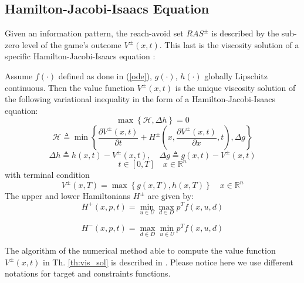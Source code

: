 \subsection{Hamilton-Jacobi-Isaacs Equation}
Given an information pattern, the reach-avoid set $RAS^\pm$ is described by the sub-zero level of the game's outcome $V^\pm(x,t)$. This last is the viscosity solution of a specific Hamilton-Jacobi-Isaacs equation \cite{new_paper}:
\begin{theorem}
    Assume $f(\cdot)$ defined as done in (\ref{ode}), $g(\cdot)$, $h(\cdot)$ globally Lipschitz continuous. Then the value function $V^\pm(x,t)$ is the unique viscosity solution of the following variational inequality in the form of a Hamilton-Jacobi-Isaacs equation:
    \[
        \max
        \left\{
            \mathcal{H}, \Delta h
        \right\} = 0
    \]
    \[
        \mathcal{H} \triangleq \min
        \left\{
            \frac{\partial V^\pm(x,t)}{\partial t} + 
            H^\pm\left(x, \frac{\partial V^\pm(x,t)}{\partial x}, t\right), \Delta g
        \right\} 
    \]
    \[
        \Delta h \triangleq h(x,t) - V^\pm(x,t), \quad \Delta g \triangleq g(x,t) - V^\pm(x,t)
    \]
    \[
        t \in [0, T] \quad x \in \mathbb{R}^n
    \]
    with terminal condition
    \[
        V^\pm(x,T) = \max \left\{ g(x,T), h(x,T) \right\} \quad x \in \mathbb{R}^n
    \]
    The upper and lower Hamiltonians $H^\pm$ are given by:
    \begin{equation}
        H^+(x,p,t) = \min_{u \in U}\max_{d \in D} p^T f(x, u, d)
        \label{h_p}
    \end{equation}

    \begin{equation}
        H^-(x,p,t) = \max_{d \in D}\min_{u \in U} p^T f(x, u, d)
        \label{h_m}
    \end{equation}
        
    \label{th:vis_sol}
\end{theorem}

The algorithm of the numerical method able to compute the value function $V^\pm(x,t)$ in Th. \ref{th:vis_sol} is described in \cite{new_paper}. Please notice here we use different notations for target and constraints functions.